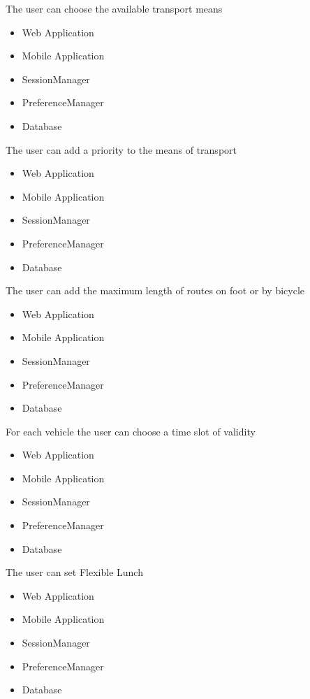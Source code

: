 \begin{itemize}
\begin{itemize}[leftmargin=1in]
 	\end{itemize}
 	\subitem[G5.3] The user can choose the available transport means
 	\begin{itemize}[leftmargin=1in]
 		\item Web Application
 		\item Mobile Application
 		\item SessionManager
 		\item PreferenceManager
 		\item Database
 	\end{itemize}
 	\subitem[G5.4] The user can add a priority to the means of transport
 	\begin{itemize}[leftmargin=1in]
 		\item Web Application
 		\item Mobile Application
 		\item SessionManager
 		\item PreferenceManager
 		\item Database
 	\end{itemize}
 	\subitem[G5.5] The user can add the maximum length of routes on foot or by bicycle
 	\begin{itemize}[leftmargin=1in]
 		\item Web Application
 		\item Mobile Application
 		\item SessionManager
 		\item PreferenceManager
 		\item Database
 	\end{itemize}
 	\subitem[G5.6] For each vehicle the user can choose a time slot of validity
 	\begin{itemize}[leftmargin=1in]
 		\item Web Application
 		\item Mobile Application
 		\item SessionManager
 		\item PreferenceManager
 		\item Database
 	\end{itemize}
 	\subitem[G5.7] The user can set Flexible Lunch
 	\begin{itemize}[leftmargin=1in]
 		\item Web Application
 		\item Mobile Application
 		\item SessionManager
 		\item PreferenceManager
 		\item Database

\end{itemize}
\end{itemize}
